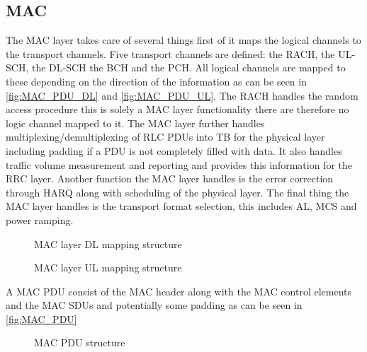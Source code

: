 \subsection{MAC}

The \gls{MAC} layer takes care of several things first of it maps the logical channels to the transport channels. Five transport channels are defined: the \gls{RACH}, the \gls{UL-SCH}, the \gls{DL-SCH} the \gls{BCH} and the \gls{PCH}. All logical channels are mapped to these depending on the direction of the information as can be seen in \autoref{fig:MAC_PDU_DL} and \autoref{fig:MAC_PDU_UL}. The \gls{RACH} handles the random access procedure this is solely a \gls{MAC} layer functionality there are therefore no logic channel mapped to it. The \gls{MAC} layer further handles multiplexing/demultiplexing of \gls{RLC} \gls{PDU}s into \gls{TB} for the physical layer including padding if a \gls{PDU} is not completely filled with data. It also handles traffic volume measurement and reporting and provides this information for the \gls{RRC} layer. Another function the \gls{MAC} layer handles is the error correction through \gls{HARQ} along with scheduling of the physical layer. The final thing the \gls{MAC} layer handles is the transport format selection, this includes \gls{AL}, \gls{MCS} and power ramping.  

\captionsetup{belowskip=0em}
\begin{minipage}{0.48\textwidth}
	\begin{figure}[H]
	\centering
	\resizebox{\textwidth}{!}{
	}
	\caption{\gls{MAC} layer \gls{DL} mapping structure}
	\label{fig:MAC_PDU_DL}
	\end{figure}
\end{minipage}
\begin{minipage}{0.48\textwidth}
	\begin{figure}[H]
	\centering
	\resizebox{\textwidth}{!}{
	}
	\caption{\gls{MAC} layer \gls{UL} mapping structure}
	\label{fig:MAC_PDU_UL}
	\end{figure}
\end{minipage}
\captionsetup{belowskip=-1.5em}

A \gls{MAC} \gls{PDU} consist of the \gls{MAC} header along with the \gls{MAC} control elements and the \gls{MAC} \gls{SDU}s and potentially some padding as can be seen in \autoref{fig:MAC_PDU}


\begin{figure}[H]
\centering
\resizebox{\textwidth}{!}{
}
\caption{MAC PDU structure}
\label{fig:MAC_PDU}
\end{figure}

